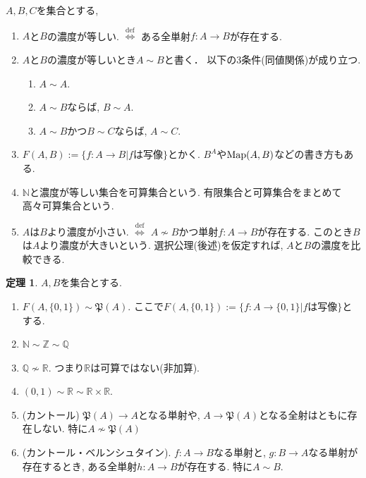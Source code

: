 \documentclass[dvipdfmx,a4paper,11pt]{article}
\newcommand{\R}{\mathbb{R}}
\newcommand{\Z}{\mathbb{Z}}
\newcommand{\Q}{\mathbb{Q}}
\newcommand{\N}{\mathbb{N}}
\theoremstyle{definition}
\newtheorem{thm}{定理}
\begin{document}
\begin{tcolorbox}[
    colback = white,
    colframe = black!35!black,
    fonttitle = \bfseries,
    breakable = true]
    $A,B, C$を集合とする,
    \begin{enumerate}
    \setlength{\parskip}{0cm} 
  \setlength{\itemsep}{0cm} 
    \item $A$と$B$の濃度が等しい. $\stackrel{\mathrm{def}}{\Longleftrightarrow}$ ある全単射$f : A \to B$が存在する.
    \item $A$と$B$の濃度が等しいとき$A \sim B$と書く． 以下の3条件(同値関係)が成り立つ.
     \begin{enumerate}[label=(\arabic*).]
 \setlength{\parskip}{0cm}
  \setlength{\itemsep}{0pt}
  \item $A \sim A$.
  \item $A \sim B$ならば, $B \sim A$.
  \item $A \sim B$かつ$B \sim C$ならば, $A \sim C$.
  \end{enumerate}
  \item $F(A, B):= \{ f : A \to B| \text{$f$は写像}\}$とかく. $B^A$や${\rm Map}(A,B)$などの書き方もある.
  \item $\N$と濃度が等しい集合を可算集合という. 有限集合と可算集合をまとめて高々可算集合という. 
  \item $A$は$B$より濃度が小さい. $\stackrel{\mathrm{def}}{\Longleftrightarrow}$ $A \not \sim B$かつ単射$f : A \to B$が存在する. このとき$B$は$A$より濃度が大きいという. 選択公理(後述)を仮定すれば, $A$と$B$の濃度を比較できる. %
    \end{enumerate}
 \end{tcolorbox}
 
\begin{tcolorbox}[
    colback = white,
    colframe = black!35!black,
    fonttitle = \bfseries,
    breakable = true]
\begin{thm}
$A, B$を集合とする.
    \begin{enumerate}
    \setlength{\parskip}{0cm} 
  \setlength{\itemsep}{0cm} 
  \item $F(A, \{0, 1\}) \sim \mathfrak{P}(A)$. ここで$F(A, \{0, 1\}):=\{ f : A \to \{0,1\} | \text{$f$は写像}\}$とする. 
  \item $\N \sim \Z \sim \Q$
  \item $\Q \not \sim \R$. つまり$\R$は可算ではない(非加算).
  \item $(0,1) \sim \R \sim \R \times \R$.
  \item (カントール) $\mathfrak{P}(A) \to A$となる単射や, $A \to \mathfrak{P}(A)$となる全射はともに存在しない. 特に$A \not \sim \mathfrak{P}(A)$
  \item (カントール・ベルンシュタイン). $f :A \to B$なる単射と, $g : B \to A$なる単射が存在するとき, ある全単射$h : A \to B$が存在する. 特に$A \sim B$.
    \end{enumerate}
    \end{thm}
 \end{tcolorbox}
 
\end{document}
